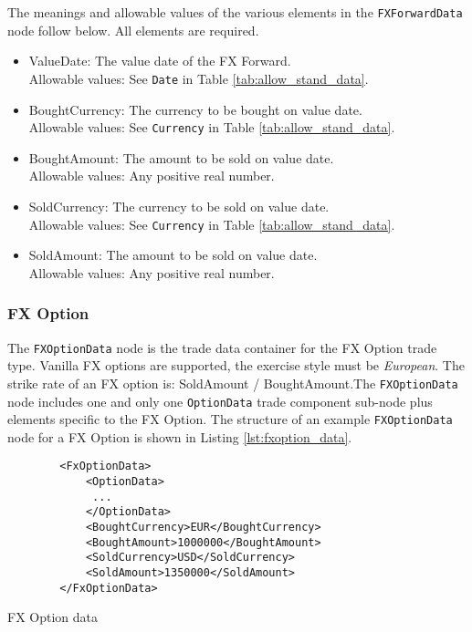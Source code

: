 The meanings and allowable values of the various elements in the \lstinline!FXForwardData!  node follow below.  All elements are required.

\begin{itemize}
\item ValueDate: The value date of the FX Forward. \\ Allowable values:  See \lstinline!Date! in Table \ref{tab:allow_stand_data}.
\item BoughtCurrency: The currency to be bought on value date.  \\ Allowable values:  See \lstinline!Currency! in Table \ref{tab:allow_stand_data}.
\item BoughtAmount: The amount to be sold on value date.  \\ Allowable values:  Any positive real number.
\item SoldCurrency: The currency to be sold on value date.  \\ Allowable values:  See \lstinline!Currency! in Table \ref{tab:allow_stand_data}.
\item SoldAmount: The amount to be sold on value date.  \\ Allowable values:  Any positive real number.

\end{itemize}


\subsubsection{FX Option}

The \lstinline!FXOptionData!  node is the trade data container for the FX Option trade type.  Vanilla FX options are
supported, the exercise style must be \emph{European}. The strike rate of an FX option is: SoldAmount / BoughtAmount.The
\lstinline!FXOptionData!  node includes one and only one \lstinline!OptionData! trade component sub-node plus elements
specific to the FX Option. The structure of an example \lstinline!FXOptionData! node for a FX Option is shown in Listing
\ref{lst:fxoption_data}.

\begin{listing}[H]
\begin{verbatim}
        <FxOptionData>
            <OptionData>
             ...
            </OptionData>
            <BoughtCurrency>EUR</BoughtCurrency>
            <BoughtAmount>1000000</BoughtAmount>
            <SoldCurrency>USD</SoldCurrency>
            <SoldAmount>1350000</SoldAmount>
        </FxOptionData>
\end{verbatim}
\caption{FX Option data}
\label{lst:fxoption_data}
\end{listing}

